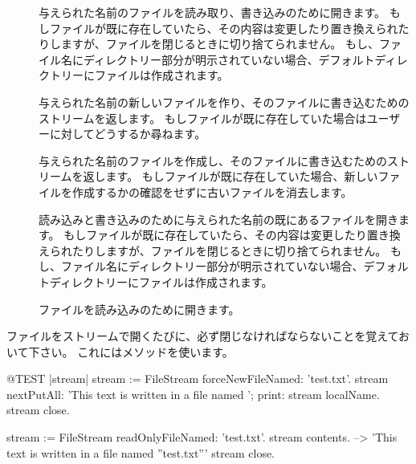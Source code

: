 \documentclass[a4paper,10pt,twoside]{book}
\begin{document}
\begin{description}

\item[] 与えられた名前のファイルを読み取り、書き込みのために開きます。
  もしファイルが既に存在していたら、その内容は変更したり置き換えられたりしますが、ファイルを閉じるときに切り捨てられません。
  もし、ファイル名にディレクトリー部分が明示されていない場合、デフォルトディレクトリーにファイルは作成されます。
  
\item[] 与えられた名前の新しいファイルを作り、そのファイルに書き込むためのストリームを返します。
  もしファイルが既に存在していた場合はユーザーに対してどうするか尋ねます。
  
\item[] 与えられた名前のファイルを作成し、そのファイルに書き込むためのストリームを返します。
  もしファイルが既に存在していた場合、新しいファイルを作成するかの確認をせずに古いファイルを消去します。

\item[] 読み込みと書き込みのために与えられた名前の既にあるファイルを開きます。
  もしファイルが既に存在していたら、その内容は変更したり置き換えられたりしますが、ファイルを閉じるときに切り捨てられません。
  もし、ファイル名にディレクトリー部分が明示されていない場合、デフォルトディレクトリーにファイルは作成されます。

\item[] ファイルを読み込みのために開きます。

\end{description}

ファイルをストリームで開くたびに、必ず閉じなければならないことを覚えておいて下さい。
これにはメソッドを使います。


\begin{code}{@TEST |stream|}
stream := FileStream forceNewFileNamed: 'test.txt'.
stream
    nextPutAll: 'This text is written in a file named ';
    print: stream localName.
stream close.

stream := FileStream readOnlyFileNamed: 'test.txt'.
stream contents. --> 'This text is written in a file named ''test.txt'''
stream close.
\end{code}
\end{document}

